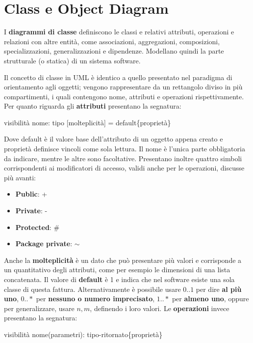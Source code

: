 \section{Class e Object Diagram}
I \textbf{diagrammi di classe} definiscono le classi e relativi attributi, operazioni e relazioni con altre entità, come associazioni, aggregazioni, composizioni, specializzazioni, generalizzazioni e dipendenze. Modellano quindi la parte strutturale (o statica) di un sistema software.\par
Il concetto di classe in UML è identico a quello presentato nel paradigma di orientamento agli oggetti; vengono rappresentare da un rettangolo diviso in più compartimenti, i quali contengono nome, attributi e operazioni rispettivamente. Per quanto riguarda gli \textbf{attributi} presentano la segnatura: \begin{center}
	visibilità nome: tipo [molteplicità] = default\{proprietà\}
\end{center}
\noindent Dove default è il valore base dell'attributo di un oggetto appena creato e proprietà definisce vincoli come sola lettura. Il nome è l'unica parte obbligatoria da indicare, mentre le altre sono facoltative. Presentano inoltre quattro simboli corrispondenti ai modificatori di accesso, validi anche per le operazioni, discusse più avanti: \begin{itemize}
	\item \textbf{Public}: +
	\item \textbf{Private}: -
	\item \textbf{Protected}: \#
	\item \textbf{Package private}: $\sim$
\end{itemize}
\noindent Anche la \textbf{molteplicità} è un dato che può presentare più valori e corrisponde a un quantitativo degli attributi, come per esempio le dimensioni di una lista concatenata. Il valore di \textbf{default} è 1 e indica che nel software esiste una sola classe di questa fattura. Alternativamente è possibile usare $0..1$ per dire \textbf{al più uno}, $0..*$ per \textbf{nessuno o numero imprecisato}, $1..*$ per \textbf{almeno uno}, oppure per generalizzare, usare $n,m$, definendo i loro valori. Le \textbf{operazioni} invece presentano la segnatura: \begin{center}
	visibilità nome(parametri): tipo-ritornato\{proprietà\}
\end{center}
\noindent 



